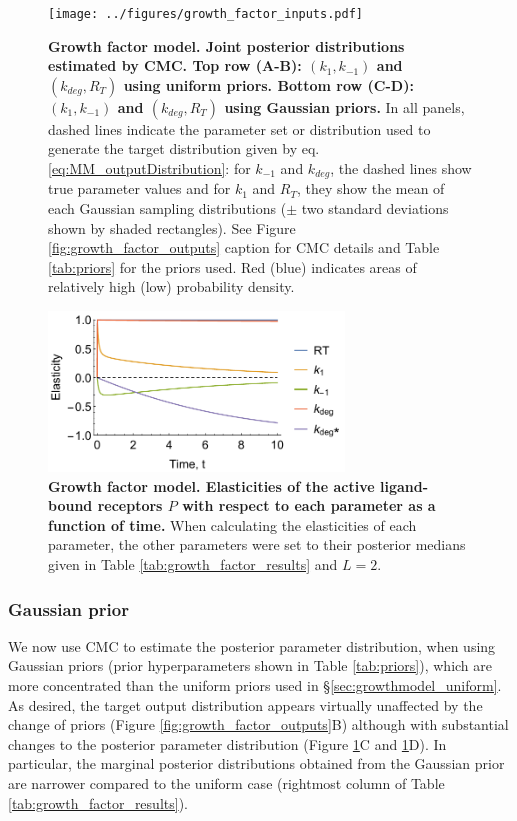 \begin{figure}[H]
	\centerline{\texttt{[image: ../figures/growth\_factor\_inputs.pdf]}}
	\caption{\textbf{Growth factor model. Joint posterior distributions estimated by CMC. Top row (A-B): $(k_1,k_{-1})$ and $(k_{deg},R_T)$ using uniform priors. Bottom row (C-D): $(k_1,k_{-1})$ and $(k_{deg},R_T)$ using Gaussian priors.} In all panels, dashed lines indicate the parameter set or distribution used to generate the target distribution given by eq. \eqref{eq:MM_outputDistribution}: for $k_{-1}$ and $k_{deg}$, the dashed lines show true parameter values and for $k_1$ and $R_T$, they show the mean of each Gaussian sampling distributions ($\pm$ two standard deviations shown by shaded rectangles). See Figure \ref{fig:growth_factor_outputs} caption for CMC details and Table \ref{tab:priors} for the priors used. Red (blue) indicates areas of relatively high (low) probability density.}
	\label{fig:growth_factor_inputs}
\end{figure}

\begin{figure}[H]
	\centerline{\includegraphics[width=0.7\textwidth]{../figures/dixit_elasticities.pdf}}
	\caption{\textbf{Growth factor model. Elasticities of the active ligand-bound receptors $P$ with respect to each parameter as a function of time.} When calculating the elasticities of each parameter, the other parameters were set to their posterior medians given in Table \ref{tab:growth_factor_results} and $L=2$.}
	\label{fig:dixit_elasticities}
\end{figure}

\subsubsection{Gaussian prior}
We now use CMC to estimate the posterior parameter distribution, when using Gaussian priors (prior hyperparameters shown in Table \ref{tab:priors}), which are more concentrated than the uniform priors used in \S\ref{sec:growthmodel_uniform}. As desired, the target output distribution appears virtually unaffected by the change of priors (Figure \ref{fig:growth_factor_outputs}B) although with substantial changes to the posterior parameter distribution (Figure \ref{fig:growth_factor_inputs}C and \ref{fig:growth_factor_inputs}D). In particular, the marginal posterior distributions obtained from the Gaussian prior are narrower compared to the uniform case (rightmost column of Table \ref{tab:growth_factor_results}).

